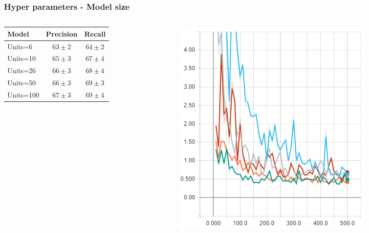 \documentclass{beamer}
\begin{document}
\begin{frame}
\frametitle{Hyper parameters - Model size}
\begin{columns}
	\begin{column}{0.5\textwidth}
		\begin{tabular}{l|c|c} 
			Model & Precision & Recall \\ \hline 
			Units=6 & $63 \pm 2$ & $64 \pm 2$ \\ 
			Units=10 & $65 \pm 3$ & $67 \pm 4$ \\ 
			Units=26 & $66 \pm 3$ & $68 \pm 4$ \\ 
			Units=50 & $66 \pm 3$ & $69 \pm 3$ \\ 
			Units=100 & $67 \pm 3$ & $69 \pm 4$ \\
		\end{tabular}
	\end{column}
	\begin{column}{0.5\textwidth}
		\begin{center}
			\includegraphics[width=\textwidth]{diff_units.png}
		\end{center}
	\end{column}
\end{columns}
\end{frame}
\end{document}
